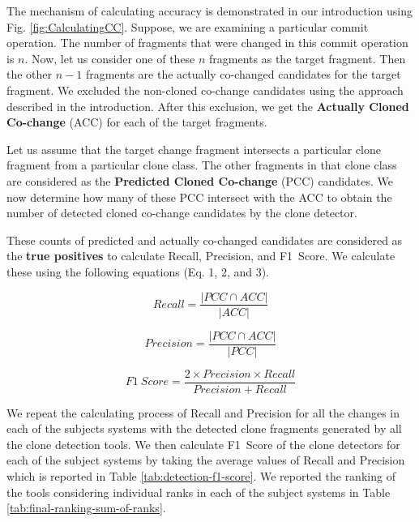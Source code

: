 \documentclass[review]{elsarticle}
\begin{document}
The mechanism of calculating accuracy is demonstrated in our introduction using Fig. \ref{fig:CalculatingCC}. Suppose, we are examining a particular commit operation. The number of fragments that were changed in this commit operation is $n$. Now, let us consider one of these $n$ fragments as the target fragment. Then the other $n-1$ fragments are the actually co-changed candidates for the target fragment. We excluded the non-cloned co-change candidates using the approach described in the introduction. After this exclusion, we get the \textbf{Actually Cloned Co-change} (ACC) for each of the target fragments. 

Let us assume that the target change fragment intersects a particular clone fragment from a particular clone class. The other fragments in that clone class are considered as the \textbf{Predicted Cloned Co-change} (PCC) candidates. We now determine how many of these PCC intersect with the ACC to obtain the number of detected cloned co-change candidates by the clone detector. 

These counts of predicted and actually co-changed candidates are considered as the \textbf{true positives} to calculate Recall, Precision, and F1~Score. We calculate these using the following equations (Eq. 1, 2, and 3).

\begin{equation}
    Recall = \frac{|PCC \cap ACC|}{|ACC|}
\end{equation}

\begin{equation}
    Precision = \frac{|PCC \cap ACC|}{|PCC|}
\end{equation}

\begin{equation}
    F1~Score = \frac{2 \times Precision \times Recall}{Precision + Recall}
\end{equation}

\vspace{1mm}
We repeat the calculating process of Recall and Precision for all the changes in each of the subjects systems with the detected clone fragments generated by all the clone detection tools. We then calculate F1~Score of the clone detectors for each of the subject systems by taking the average values of Recall and Precision which is reported in Table \ref{tab:detection-f1-score}. We reported the ranking of the tools considering individual ranks in each of the subject systems in Table \ref{tab:final-ranking-sum-of-ranks}.
\end{document}
